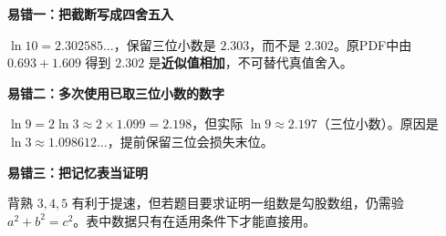 \clearpage
\begin{trapbox}
\textbf{\textcolor{CTrap}{易错一：把截断写成四舍五入}}
\par\medskip
\begin{center}

\end{center}
\medskip
$\ln10=2.302585\ldots$，保留三位小数是 $\boxed{2.303}$，而不是 $2.302$。原PDF中由 $0.693+1.609$ 得到 $2.302$ 是\textbf{近似值相加}，不可替代真值舍入。
\end{trapbox}
\clearpage
\begin{trapbox}
\textbf{\textcolor{CTrap}{易错二：多次使用已取三位小数的数字}}
\par\medskip
\begin{center}

\end{center}
\medskip
$\ln9=2\ln3\approx2\times1.099=2.198$，但实际 $\ln9\approx2.197$（三位小数）。原因是 $\ln3\approx1.098612\ldots$，提前保留三位会损失末位。
\end{trapbox}
\clearpage
\begin{trapbox}
\textbf{\textcolor{CTrap}{易错三：把记忆表当证明}}
\par\medskip
\begin{center}

\end{center}
\medskip
背熟 $3,4,5$ 有利于提速，但若题目要求证明一组数是勾股数组，仍需验 $a^2+b^2=c^2$。表中数据只有在适用条件下才能直接用。
\end{trapbox}
